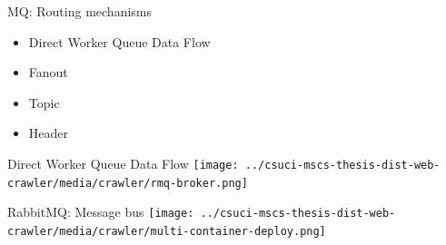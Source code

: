 \documentclass[9pt]{beamer}
\begin{document}
\begin{frame}{MQ: Routing mechanisms}
  \begin{itemize}
    \pause
  \item Direct Worker Queue Data Flow
    \pause
  \item Fanout
    \pause
  \item Topic
    \pause
  \item Header
  \end{itemize}
\end{frame}


\begin{frame}{Direct Worker Queue Data Flow}
  \centering
  \texttt{[image: ../csuci-mscs-thesis-dist-web-crawler/media/crawler/rmq-broker.png]}
\end{frame}


\begin{frame}{RabbitMQ: Message bus}
  \centering
  \texttt{[image: ../csuci-mscs-thesis-dist-web-crawler/media/crawler/multi-container-deploy.png]}
\end{frame}

\end{document}
